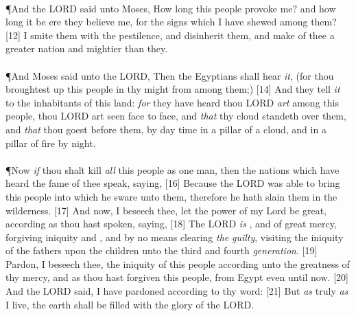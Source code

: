 \\
\P \textcolor[cmyk]{0.99998,1,0,0}{And the LORD said unto Moses, How long  this people provoke me? and how long  it be ere they believe me, for  the signs which I have shewed among them?}
[12] \textcolor[cmyk]{0.99998,1,0,0}{I  smite them with the pestilence, and disinherit them, and  make of thee a greater nation and mightier than they.}\\
\\
\P \textcolor[cmyk]{0.99998,1,0,0}{And Moses said unto the LORD, Then the Egyptians shall hear \emph{it}, (for thou broughtest up this people in thy might from among them;)}
[14] \textcolor[cmyk]{0.99998,1,0,0}{And they  tell \emph{it} to the inhabitants of this land: \emph{for} they have heard   thou LORD \emph{art} among this people,   thou LORD art seen face to face, and \emph{that} thy cloud standeth over them, and \emph{that} thou goest before them, by day time in a pillar of a cloud, and in a pillar of fire by night.}\\
\\
\P \textcolor[cmyk]{0.99998,1,0,0}{Now \emph{if} thou shalt kill \emph{all} this people as one man, then the nations which have heard the fame of thee  speak, saying,}
[16] \textcolor[cmyk]{0.99998,1,0,0}{Because the LORD was  able to bring this people into  which he sware unto them, therefore he hath slain them in the wilderness.}
[17] \textcolor[cmyk]{0.99998,1,0,0}{And now, I beseech thee, let the power of my Lord be great, according as thou hast spoken, saying,}
[18] \textcolor[cmyk]{0.99998,1,0,0}{The LORD \emph{is} , and of great mercy, forgiving iniquity and , and by no means clearing \emph{the} \emph{guilty}, visiting the iniquity of the fathers upon the children unto the third and fourth \emph{generation}.}
[19] \textcolor[cmyk]{0.99998,1,0,0}{Pardon, I beseech thee, the iniquity of this people according unto the greatness of thy mercy, and as thou hast forgiven this people, from Egypt even until now.}
[20] \textcolor[cmyk]{0.99998,1,0,0}{And the LORD said, I have pardoned according to thy word:}
[21] \textcolor[cmyk]{0.99998,1,0,0}{But \emph{as} truly \emph{as} I live,  the earth shall be filled with the glory of the LORD.}
